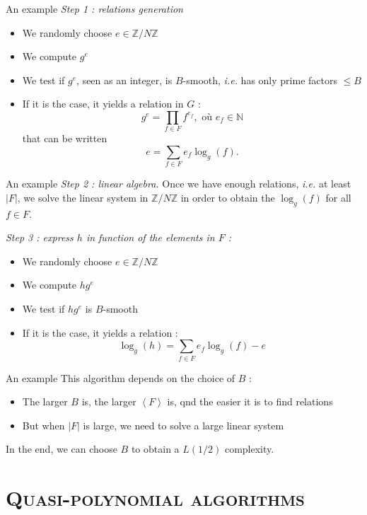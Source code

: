 \documentclass[xcolor=x11names,compress]{beamer}
\theoremstyle{break}
\theoremstyle{sc}
\theoremstyle{definition}
\theoremstyle{remark}
\newcommand{\ie}{\emph{i.e. }}
\begin{document}
\begin{frame}{An example}
  \emph{Step 1 : relations generation}
  \begin{itemize}
    \item We randomly choose $e\in \mathbb{Z}/N\mathbb{Z}$
    \item We compute $g^e$
    \item We test if $g^e$, seen as an integer, is $B$-smooth, \ie has only
      prime factors $\leq B$
    \item If it is the case, it yields a relation in $G$ :
      \[ 
        g^e = \prod_{f\in F}f^{e_f}, \text{ où } e_f\in \mathbb{N}
      \]
      that can be written
      \[
        e = \sum_{f\in F}e_f\log_g(f).
      \]
  \end{itemize}
\end{frame}

\begin{frame}{An example}
  \emph{Step 2 : linear algebra.} Once we have enough relations, \ie at least
  $|F|$, we solve the linear system in $\mathbb{Z}/N\mathbb{Z}$ in order to
  obtain the $\log_g(f)$ for all $f\in F$.
  
  \emph{Step 3 : express $h$ in function of the elements in $F$ :}
  \begin{itemize}
     \item We randomly choose $e\in \mathbb{Z}/N\mathbb{Z}$
    \item We compute $hg^e$
    \item We test if $hg^e$ is $B$-smooth
    \item If it is the case, it yields a relation  :
     \[
      \log_g(h) = \sum_{f\in F}e_f\log_g(f) - e
      \]
  \end{itemize}

\end{frame}

\begin{frame}{An example}
  This algorithm depends on the choice of $B$ :
  \begin{itemize}
    \item The larger $B$ is, the larger $\left\langle F \right\rangle$ is, qnd
      the easier it is to find relations
    \item But when $|F|$ is large, we need to solve a large linear system
  \end{itemize}
  In the end, we can choose $B$ to obtain a $L(1/2)$ complexity.
\end{frame}

\section{\scshape Quasi-polynomial algorithms} 
\end{document}
